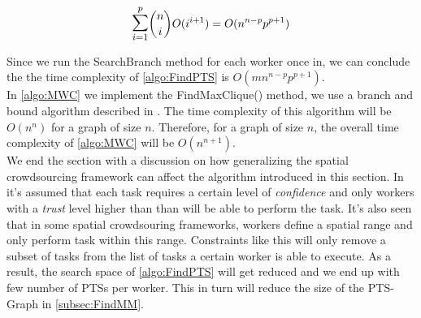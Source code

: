 \begin{equation*}
\mathlarger{\mathlarger{\sum}}_{i = 1}^{p} \dbinom{n}{i} O(i^{i+1}) = O(n^{n-p}p^{p+1})
\end{equation*}

Since we run the SearchBranch method for each worker once in, we can conclude the the time complexity of \ref{algo:FindPTS} is $O(mn^{n-p}p^{p+1})$.\\

In \cref{algo:MWC} we implement the FindMaxClique() method, we use a branch and bound algorithm described in \cite{Ostergard01}. The time complexity of this algorithm will be $O(n^n)$ for a graph of size $n$. Therefore, for a graph of size $n$, the overall time complexity of \cref{algo:MWC} will be $O(n^{n+1})$.\\

We end the section with a discussion on how generalizing the spatial crowdsourcing framework can affect the algorithm introduced in this section. In \cite{Kazemi13} it's assumed that each task requires a certain level of \emph{confidence} and only workers with a \emph{trust} level higher than than will be able to perform the task. It's also seen that in some spatial crowdsouring frameworks, workers define a spatial range and only perform task within this range. Constraints like this will only remove a subset of tasks from the list of tasks a certain worker is able to execute. As a result, the search space of \cref{algo:FindPTS} will get reduced and we end up with few number of PTSs per worker. This in turn will reduce the size of the PTS-Graph in \cref{subsec:FindMM}.